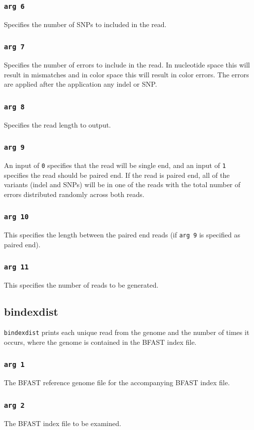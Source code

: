 \documentclass[a4paper,12pt]{book}
\newcommand{\TT}[1]{{\tt #1}} %
\newcommand{\BRGF}{BFAST reference genome file} %
\newcommand{\BIF}{BFAST index file} %
\begin{document}
\subsubsection{\TT{arg 6}}
Specifies the number of SNPs to included in the read.
\subsubsection{\TT{arg 7}}
Specifies the number of errors to include in the read.
In nucleotide space this will result in mismatches and in color space this will result in color errors.
The errors are applied after the application any indel or SNP.
\subsubsection{\TT{arg 8}}
Specifies the read length to output.
\subsubsection{\TT{arg 9}}
An input of \TT{0} specifies that the read will be single end, and an input of \TT{1} specifies the read should be paired end.
If the read is paired end, all of the variants (indel and SNPs) will be in one of the reads with the total number of errors distributed randomly across both reads.
\subsubsection{\TT{arg 10}}
This specifies the length between the paired end reads (if \TT{arg 9} is specified as paired end).
\subsubsection{\TT{arg 11}}
This specifies the number of reads to be generated.

\subsection{bindexdist}
\label{sec:bindexdist}
\TT{bindexdist} prints each unique read from the genome and the number of times it occurs, where the genome is contained in the \BIF{}.
\subsubsection{\TT{arg 1}}
The \BRGF{} for the accompanying \BIF{}.
\subsubsection{\TT{arg 2}}
The \BIF{} to be examined.
\end{document}
